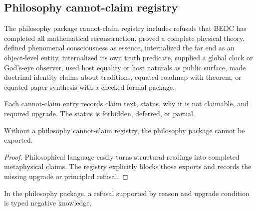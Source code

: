 \subsection{Philosophy cannot-claim registry}
\label{subsec:philosophy-package-cannot-claim}

\begin{definition}
\label{def:philosophy-package-cannot-claim-registry}
The philosophy package cannot-claim registry includes refusals that
BEDC has completed all mathematical reconstruction, proved a complete
physical theory, defined phenomenal consciousness as essence,
internalized the far end as an object-level entity, internalized its
own truth predicate, supplied a global clock or God's-eye observer,
used host equality or host naturals as public surface, made doctrinal
identity claims about traditions, equated roadmap with theorem, or
equated paper synthesis with a checked formal package.
\end{definition}

\begin{definition}
\label{def:philosophy-package-registry-entry-format}
Each cannot-claim entry records claim text, status, why it is not
claimable, and required upgrade. The status is forbidden, deferred, or
partial.
\end{definition}

\begin{theorem}
\label{thm:philosophy-package-cannot-claim-required}
Without a philosophy cannot-claim registry, the philosophy package
cannot be exported.
\end{theorem}
\begin{proof}
Philosophical language easily turns structural readings into completed
metaphysical claims. The registry explicitly blocks those exports and
records the missing upgrade or principled refusal.
\end{proof}

\begin{corollary}
\label{cor:philosophy-package-refusal-content}
In the philosophy package, a refusal supported by reason and upgrade
condition is typed negative knowledge.
\end{corollary}

